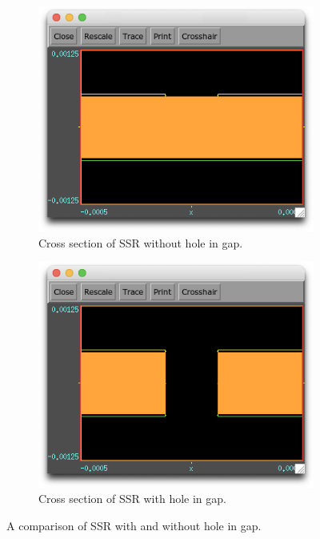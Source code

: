 \begin{figure}
\centering
\begin{subfigure}{0.5\textwidth}
  \centering
  \includegraphics[width=0.9\linewidth]{chapter_4/figures/SSR_no_gap_start.png}
  \caption{Cross section of SSR without hole in gap.}
  \label{fig:SSR_no_gap_start}
\end{subfigure}%
\begin{subfigure}{.5\textwidth}
  \centering
  \includegraphics[width=0.9\linewidth]{chapter_4/figures/SSR_with_gap_start.png}
  \caption{Cross section of SSR with hole in gap.}
  \label{fig:SSR_with_gap_start}
\end{subfigure}
\caption{A comparison of SSR with and without hole in gap.}
\label{fig:SSR_hole_comparison_start}
\end{figure}

